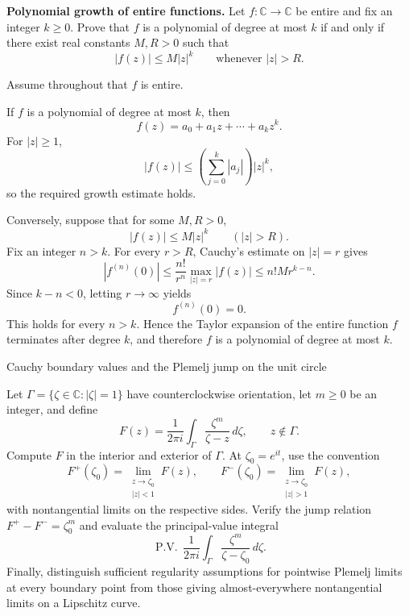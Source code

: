 \begin{problem}[CP-IV-0021]
\label{prob:cp-iv-0021}
\par\noindent\textbf{Polynomial growth of entire functions.}\quad
Let $f:\mathbb C\to\mathbb C$ be entire and fix an integer $k\ge0$.
Prove that $f$ is a polynomial of degree at most $k$ if and only if
there exist real constants $M,R>0$ such that
\[
|f(z)|\le M|z|^k\qquad\text{whenever }|z|>R.
\]
\end{problem}

\begin{solution}
Assume throughout that \(f\) is entire.

If \(f\) is a polynomial of degree at most \(k\), then
\[
f(z)=a_0+a_1z+\cdots+a_kz^k.
\]
For \(|z|\ge1\),
\[
|f(z)|
\le
\left(\sum_{j=0}^k|a_j|\right)|z|^k,
\]
so the required growth estimate holds.

Conversely, suppose that for some \(M,R>0\),
\[
|f(z)|\le M|z|^k
\qquad(|z|>R).
\]
Fix an integer \(n>k\). For every \(r>R\), Cauchy's estimate on \(|z|=r\) gives
\[
|f^{(n)}(0)|
\le
\frac{n!}{r^n}\max_{|z|=r}|f(z)|
\le
n!M r^{k-n}.
\]
Since \(k-n<0\), letting \(r\to\infty\) yields
\[
f^{(n)}(0)=0.
\]
This holds for every \(n>k\). Hence the Taylor expansion of the entire function \(f\) terminates after degree \(k\), and therefore \(f\) is a polynomial of degree at most \(k\).
\end{solution}


\begin{problem}[CP-IV-0022]
\label{prob:cp-iv-0022}
Cauchy boundary values and the Plemelj jump on the unit circle

Let $\Gamma=\{\zeta\in\mathbb C:|\zeta|=1\}$ have counterclockwise orientation, let $m\ge 0$ be an integer, and define
\[
F(z)=\frac{1}{2\pi i}\int_{\Gamma}\frac{\zeta^m}{\zeta-z}\,d\zeta,
\qquad z\notin\Gamma.
\]
Compute $F$ in the interior and exterior of $\Gamma$. At $\zeta_0=e^{it}$, use the convention
\[
F^+(\zeta_0)=\lim_{\substack{z\to\zeta_0\\ |z|<1}}F(z),
\qquad
F^-(\zeta_0)=\lim_{\substack{z\to\zeta_0\\ |z|>1}}F(z),
\]
with nontangential limits on the respective sides. Verify the jump relation
$F^+-F^-=\zeta_0^m$ and evaluate the principal-value integral
\[
\operatorname{P.V.}\,\frac{1}{2\pi i}
\int_{\Gamma}\frac{\zeta^m}{\zeta-\zeta_0}\,d\zeta.
\]
Finally, distinguish sufficient regularity assumptions for pointwise Plemelj limits at every boundary point from those giving almost-everywhere nontangential limits on a Lipschitz curve.
\end{problem}

